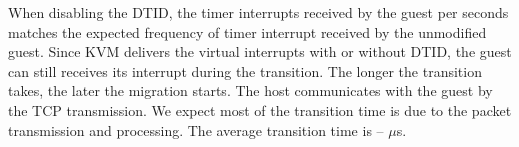 When disabling the DTID, the timer interrupts received by the
guest per seconds matches the expected frequency of timer
interrupt received by the unmodified guest. Since KVM delivers
the virtual interrupts with or without DTID, the guest can
still receives its interrupt during the transition. The longer
the transition takes, the later the migration starts. The host
communicates with the guest by the TCP transmission. We expect
most of the transition time is due to the packet transmission
and processing. The average transition time is -- $\mu$s.

